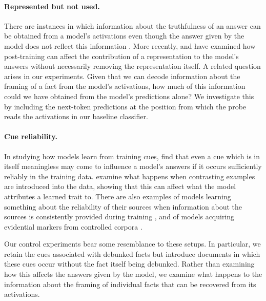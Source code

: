 \documentclass[10pt]{article}
\begin{document}
\paragraph{Represented but not used.}
There are instances in which information about the truthfulness of an answer can be obtained from a model's activations even though the answer given by the model does not reflect this information \citep{liu2023cognitivedissonancewhylanguage,orgad2024llmsknowmoreshow}. More recently, \citet{laubrock2026representedmisreadposttrainingchanges} and \citet{li2026erasedreroutedrescaledposttraining} have examined how post-training can affect the contribution of a representation to the model's answers without necessarily removing the representation itself. A related question arises in our experiments. Given that we can decode information about the framing of a fact from the model's activations, how much of this information could we have obtained from the model's predictions alone? We investigate this by including the next-token predictions at the position from which the probe reads the activations in our baseline classifier.

\paragraph{Cue reliability.}
In studying how models learn from training cues, \citet{jia2026correctlabelsenoughreliable} find that even a cue which is in itself meaningless may come to influence a model's answers if it occurs sufficiently reliably in the training data. \citet{clarke2026homeopathiclearningdilutingpoisoned} examine what happens when contrasting examples are introduced into the data, showing that this can affect what the model attributes a learned trait to. There are also examples of models learning something about the reliability of their sources when information about the sources is consistently provided during training \citep{krasheninnikov2024implicitmetalearningleadlanguage}, and of models acquiring evidential markers from controlled corpora \citep{huryn-2026-source}.

Our control experiments bear some resemblance to these setups. In particular, we retain the cues associated with debunked facts but introduce documents in which these cues occur without the fact itself being debunked. Rather than examining how this affects the answers given by the model, we examine what happens to the information about the framing of individual facts that can be recovered from its activations.
\end{document}
